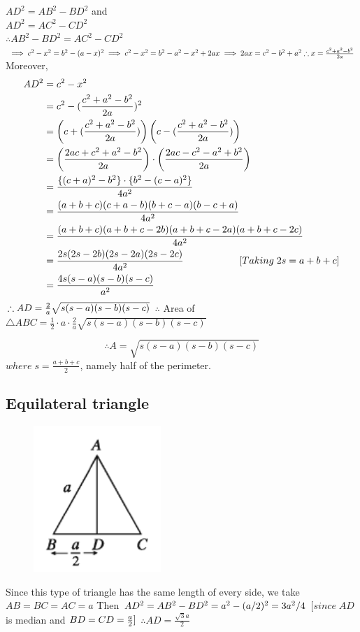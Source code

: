 $AD^2=AB^2-BD^2$ and\\ $AD^2=AC^2-CD^2$ \\ $\therefore AB^2-BD^2 = AC^2-CD^2 $\\
$
\implies c^2-x^2=b^2-(a-x)^2\\
\implies c^2-x^2=b^2-a^2-x^2+2ax\\
\implies 2ax=c^2-b^2+a^2\\
\therefore x=\frac{c^2+a^2-b^2}{2a}\\[2ex]
$
Moreover,
\begin{align*}
AD^2&=c^2-x^2\\
	&=c^2-(\frac{c^2+a^2-b^2}{2a})^2\\
	&=\left(c+(\frac{c^2+a^2-b^2}{2a})\right)\left(c-(\frac{c^2+a^2-b^2}{2a})\right)\\
	&=\left(\frac{2ac+c^2+a^2-b^2}{2a}\right)\cdot \left(\frac{2ac-c^2-a^2+b^2}{2a}\right)\\
	&=\frac{\{(c+a)^2-b^2\}\cdot\{b^2-(c-a)^2\}}{4a^2}\\
	&=\frac{(a+b+c)(c+a-b)(b+c-a)(b-c+a)}{4a^2}\\
	&=\frac{(a+b+c)(a+b+c-2b)(a+b+c-2a)(a+b+c-2c)}{4a^2}\\
	&=\frac{2s(2s-2b)(2s-2a)(2s-2c)}{4a^2}\hspace*{2cm} [Taking\; 2s=a+b+c]\\
	&=\frac{4s(s-a)(s-b)(s-c)}{a^2}\\
\end{align*}
$ \therefore AD=\frac{2}{a}\sqrt{s(s-a)(s-b)(s-c)}\\[1ex]$
$\therefore$ Area of $\triangle ABC=\frac{1}{2}\cdot a\cdot \frac{2}{a}\sqrt{s(s-a)(s-b)(s-c)}$

\begin{equation}\label{e3}
	\therefore A=\sqrt{s(s-a)(s-b)(s-c)}
\end{equation}
$ where \;s=\frac{a+b+c}{2}$, namely half of the perimeter.


\subsection{Equilateral triangle}
\begin{figure}
	\includegraphics[width=1.9in]{pics/elt}
\end{figure}
Since this type of triangle has the same length of every side, we take $AB=BC=AC=a$
Then $AD^2=AB^2-BD^2=a^2-(a/2)^2=3a^2/4\\$ $[ since\; AD$ is median and $BD=CD=\frac{a}{2} ]\\$
$\therefore AD=\frac{\sqrt{3}a}{2}$\\


